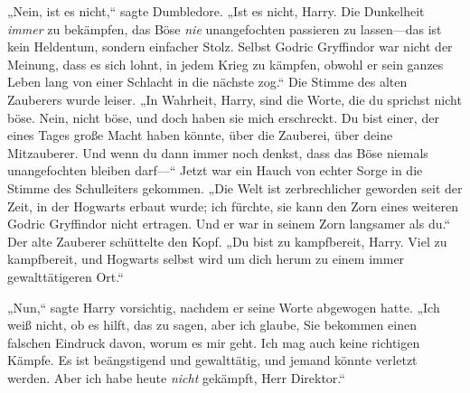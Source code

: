 „Nein, ist es nicht,“ sagte Dumbledore. „Ist es nicht, Harry. Die Dunkelheit \emph{immer} zu bekämpfen, das Böse \emph{nie} unangefochten passieren zu lassen—das ist kein Heldentum, sondern einfacher Stolz. Selbst Godric Gryffindor war nicht der Meinung, dass es sich lohnt, in jedem Krieg zu kämpfen, obwohl er sein ganzes Leben lang von einer Schlacht in die nächste zog.“ Die Stimme des alten Zauberers wurde leiser. „In Wahrheit, Harry, sind die Worte, die du sprichst nicht böse. Nein, nicht böse, und doch haben sie mich erschreckt. Du bist einer, der eines Tages große Macht haben könnte, über die Zauberei, über deine Mitzauberer. Und wenn du dann immer noch denkst, dass das Böse niemals unangefochten bleiben darf—“ Jetzt war ein Hauch von echter Sorge in die Stimme des Schulleiters gekommen. „Die Welt ist zerbrechlicher geworden seit der Zeit, in der Hogwarts erbaut wurde; ich fürchte, sie kann den Zorn eines weiteren Godric Gryffindor nicht ertragen. Und er war in seinem Zorn langsamer als du.“ Der alte Zauberer schüttelte den Kopf. „Du bist zu kampfbereit, Harry. Viel zu kampfbereit, und Hogwarts selbst wird um dich herum zu einem immer gewalttätigeren Ort.“

„Nun,“ sagte Harry vorsichtig, nachdem er seine Worte abgewogen hatte. „Ich weiß nicht, ob es hilft, das zu sagen, aber ich glaube, Sie bekommen einen falschen Eindruck davon, worum es mir geht. Ich mag auch keine richtigen Kämpfe. Es ist beängstigend und gewalttätig, und jemand könnte verletzt werden. Aber ich habe heute \emph{nicht} gekämpft, Herr Direktor.“

